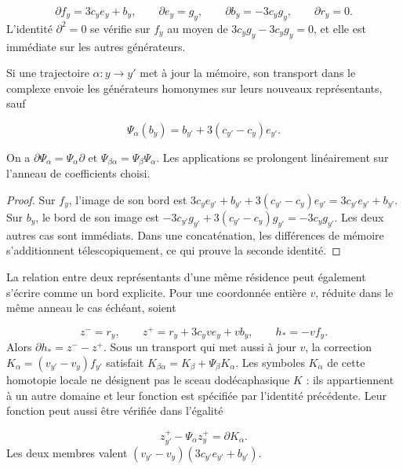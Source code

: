\[
\partial f_y=3c_y e_y+b_y,\qquad
\partial e_y=g_y,\qquad
\partial b_y=-3c_y g_y,\qquad
\partial r_y=0.
\]
L'identité \(\partial^2=0\) se vérifie sur \(f_y\) au moyen de \(3c_yg_y-3c_yg_y=0\), et elle est immédiate sur les autres générateurs.

Si une trajectoire \(\alpha:y\to y'\) met à jour la mémoire, son transport dans le complexe envoie les générateurs homonymes sur leurs nouveaux représentants, sauf

\[
\Psi_\alpha(b_y)=b_{y'}+3(c_{y'}-c_y)e_{y'}.
\]
\begin{proposition}
\label{iv:cont:memoria-natural}
On a \(\partial\Psi_\alpha=\Psi_\alpha\partial\) et \(\Psi_{\beta\alpha}=\Psi_\beta\Psi_\alpha\). Les applications se prolongent linéairement sur l'anneau de coefficients choisi.

\end{proposition}
\begin{proof}
Sur \(f_y\), l'image de son bord est \(3c_ye_{y'}+b_{y'}+3(c_{y'}-c_y)e_{y'} =3c_{y'}e_{y'}+b_{y'}\). Sur \(b_y\), le bord de son image est \(-3c_{y'}g_{y'}+3(c_{y'}-c_y)g_{y'}=-3c_yg_{y'}\). Les deux autres cas sont immédiats. Dans une concaténation, les différences de mémoire s'additionnent télescopiquement, ce qui prouve la seconde identité.
\end{proof}

La relation entre deux représentants d'une même résidence peut également s'écrire comme un bord explicite. Pour une coordonnée entière \(v\), réduite dans le même anneau le cas échéant, soient

\[
z^-=r_y,\qquad z^+=r_y+3c_yv e_y+v b_y,
\qquad h_*=-vf_y.
\]
Alors \(\partial h_*=z^--z^+\). Sous un transport qui met aussi à jour \(v\), la correction \(K_\alpha=(v_{y'}-v_y)f_{y'}\) satisfait \(K_{\beta\alpha}=K_\beta+\Psi_\beta K_\alpha\). Les symboles \(K_\alpha\) de cette homotopie locale ne désignent pas le sceau dodécaphasique \(K\) : ils appartiennent à un autre domaine et leur fonction est spécifiée par l'identité précédente. Leur fonction peut aussi être vérifiée dans l'égalité

\[
z^+_{y'}-\Psi_\alpha z^+_y=\partial K_\alpha.
\]
Les deux membres valent \((v_{y'}-v_y)(3c_{y'}e_{y'}+b_{y'})\).

